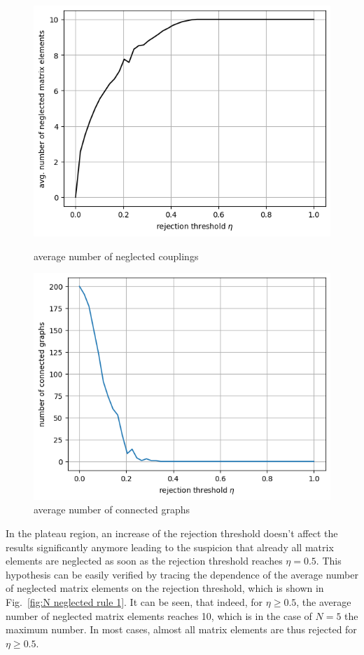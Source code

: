 \documentclass{article}
\begin{document}
	
	\begin{figure}[h]
		\begin{minipage}{0.49\textwidth}
			\centering
			\includegraphics[width=\textwidth]{img/N_neglected_rule_1.png}
			\caption{average number of neglected couplings}
			\label{fig:N neglected rule 1}
		\end{minipage}
		\begin{minipage}{0.49\textwidth}
			\centering
			\includegraphics[width=\textwidth]{img/N_connected_rule_1.png}
			\caption{average number of connected graphs}
			\label{fig:N connected rule 1}
		\end{minipage}	
	\end{figure}
	In the plateau region, an increase of the rejection threshold doesn't affect the results significantly anymore leading to the suspicion that already all matrix elements are neglected as soon as the rejection threshold reaches $\eta=0.5$.
	This hypothesis can be easily verified by tracing the dependence of the average number of neglected matrix elements on the rejection threshold, which is shown in Fig.~\ref{fig:N neglected rule 1}. It can be seen, that indeed, for $\eta\geq0.5$, the average number of neglected matrix elements reaches 10, which is in the case of $N=5$ the maximum number. In most cases, almost all matrix elements are thus rejected for $\eta\geq0.5$.
	
\end{document}
